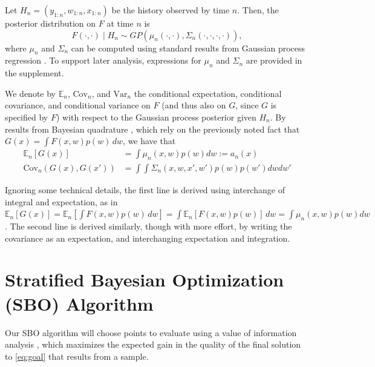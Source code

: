 \documentclass{article} %
\newcommand{\w}{w}
\begin{document}
Let $H_{n} = \left( y_{1:n},\w_{1:n},x_{1:n}\right)$ be the history observed by time $n$.
Then, the posterior distribution on $F$ at time $n$ is
\[
F\left(\cdot,\cdot\right)\mid H_{n}\sim GP\left(\mu_{n}\left(\cdot,\cdot\right),\Sigma_{n}\left(\cdot,\cdot,\cdot,\cdot\right)\right),
\]
where $\mu_{n}$ and $\Sigma_{n}$ can be computed using standard
results from Gaussian process regression \cite{RaWi06}.
To support later analysis, expressions for $\mu_n$ and $\Sigma_n$ are provided in the supplement.


We denote by $\mathbb{E}_{n}$, $\mathrm{Cov}_{n}$, and $\mathrm{Var}_n$ the conditional expectation, conditional covariance, and conditional variance
on $F$ (and thus also on $G$, since $G$ is specified by $F$) with respect to the Gaussian process posterior given $H_n$.
By results from Bayesian quadrature \cite{o1991bayes}, which rely on the
previously noted fact that $G(x) = \int F(x,\w) p(\w)\,d\w$,
we have that
\begin{align}
\mathbb{E}_{n}\left[G(x) \right] 
&= \int\mu_{n}(x,w)p\left(w\right)d\w := a_n(x) \label{eq:a_n} \\
\mbox{Cov}_{n}\left(G(x),G(x')\right)
& = \int\int\Sigma_{n}\left(x,\w,x',\w'\right)p\left(\w\right)p\left(\w'\right)d\w d\w'
\end{align}

Ignoring some technical details, the first line is derived using interchange of integral and expectation, as in 
$\mathbb{E}_{n}\left[G(x) \right] 
= \mathbb{E}_{n}\left[\int F(x,\w) p(\w)\,d\w \right] 
= \int \mathbb{E}_{n}\left[F(x,\w) p(\w) \right] \,d\w
= \int\mu_{n}(x,w)p\left(w\right)d\w$.
The second line is derived similarly, though with more effort, by writing the covariance as an expectation, and interchanging expectation and integration.



\section{Stratified Bayesian Optimization (SBO) Algorithm}
\label{SBO}
Our SBO algorithm will choose points to evaluate using a value of information analysis \cite{Ho66}, which maximizes the expected gain in the quality of the final solution to \eqref{eq:goal} that results from a sample.
\end{document}
